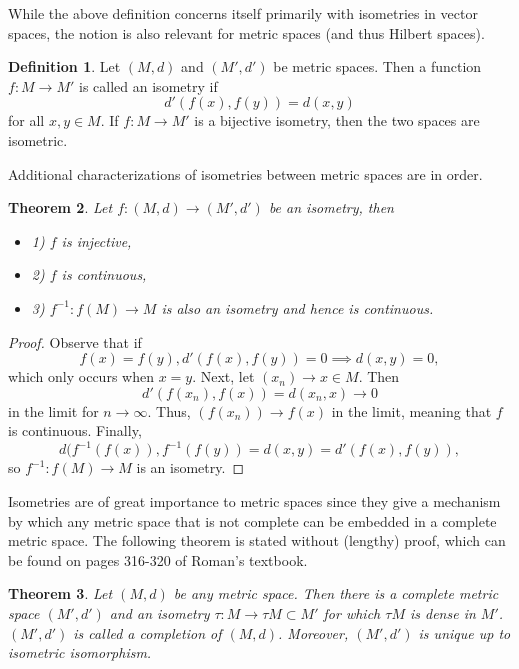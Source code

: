 \documentclass{article}
\newtheorem{thm}{Theorem}[section]
\theoremstyle{definition}
\newtheorem{defn}[thm]{Definition}
\theoremstyle{remark}
\numberwithin{equation}{section}
\begin{document}
While the above definition concerns itself primarily with isometries in vector spaces, the notion is also relevant for metric spaces (and thus Hilbert spaces). 

\begin{defn}
Let $(M,d)$ and $(M', d')$ be metric spaces. Then a function $f: M \rightarrow M'$ is called an isometry if 
$$d'(f(x), f(y)) = d(x,y) $$
for all $x,y \in M$. If $f:M \rightarrow M'$ is a bijective isometry, then the two spaces are isometric. 
\end{defn}

Additional characterizations of isometries between metric spaces are in order. 

\begin{thm}
Let $f: (M,d) \rightarrow (M', d')$ be an isometry, then 
\begin{itemize}
    \item 1) $f$ is injective, 
    \item 2) $f$ is continuous, 
    \item 3) $f^{-1} : f(M) \rightarrow M$ is also an isometry and hence is continuous. 
\end{itemize}
\end{thm}

\begin{proof}
Observe that if
$$f(x) = f(y), d'(f(x), f(y)) = 0 \implies d(x,y) = 0, $$
which only occurs when $x = y$. Next, let $(x_n) \rightarrow x \in M$. Then 
$$d'(f(x_n), f(x)) = d(x_n, x) \rightarrow 0 $$
in the limit for $n \rightarrow \infty.$ Thus, $(f(x_n)) \rightarrow f(x)$ in the limit, meaning that $f$ is continuous. Finally, 
$$d(f^{-1} (f(x)), f^{-1}(f(y)) = d(x,y) = d'(f(x), f(y)), $$
so $f^{-1} : f(M) \rightarrow M$ is an isometry. 
\end{proof}

Isometries are of great importance to metric spaces since they give a mechanism by which any metric space that is not complete can be embedded in a complete metric space. The following theorem is stated without (lengthy) proof, which can be found on pages 316-320 of Roman's textbook. 

\begin{thm}
Let $(M, d)$ be any metric space. Then there is a complete metric space $(M', d')$ and an isometry $\tau : M \rightarrow \tau M \subset M'$ for which $\tau M$ is dense in $M'$. $(M', d')$ is called a completion of $(M,d)$. Moreover, $(M',d')$ is unique up to isometric isomorphism. 
\end{thm}
\end{document}
